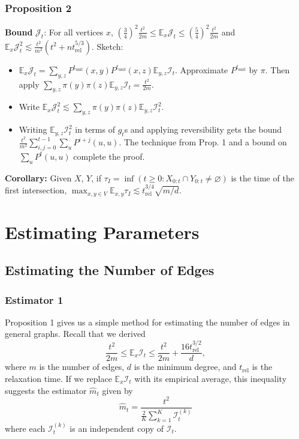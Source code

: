 \documentclass{beamer}
\newcommand{\E}{\mathbb{E}}
\begin{document}
\begin{frame}
\frametitle{Proposition 2}
\textbf{Bound} $\mathcal{J}_t$: For all vertices $x$, $\left(\frac{3}{4}\right)^2 \frac{t^2}{2m}\leq \E_x\mathcal{J}_t\leq \left(\frac{5}{4}\right)^2 \frac{t^2}{2m}$ and $\E_x \mathcal{J}_t^2\lesssim \frac{t^2}{m^2}\left(t^2+nt_{\text{rel}}^{5/3}\right)$. Sketch:
\begin{itemize}
    \item $\E_x\mathcal{J}_t=\sum_{y,z} P^{t_{\text{unif}}}(x,y)P^{t_{\text{unif}}}(x,z)\E_{y,z}\mathcal{I}_t$. Approximate $P^{t_{\text{unif}}}$ by $\pi$. Then apply $\sum_{y,z} \pi(y)\pi(z)\E_{y,z}\mathcal{I}_t=\frac{t^2}{2m}$.
    \item Write $\E_x\mathcal{J}_t^2\lesssim \sum_{y,z} \pi(y)\pi(z)\E_{y,z}\mathcal{I}_t^2$.
    \item Writing $\E_{y,z}\mathcal{I}_t^2$ in terms of $g_t$s and applying reversibility gets the bound $\frac{t^2}{m^2}\sum_{i,j=0}^{t-1}\sum_u P^{i+j}(u,u)$. The technique from Prop. 1 and a bound on $\sum_u P^t(u,u)$ complete the proof.
\end{itemize}
\textbf{Corollary:} Given $X$, $Y$, if $\tau_I=\inf(t\geq 0: X_{0:t}\cap Y_{0:t}\neq \varnothing)$ is the time of the first intersection, $\max_{x,y\in V}\E_{x,y}\tau_I\lesssim t_{\text{rel}}^{3/4}\sqrt{m/d}$.
\end{frame}


\section{Estimating Parameters}
\subsection{Estimating the Number of Edges}
\begin{frame}
\frametitle{Estimator 1}
Proposition 1 gives us a simple method for estimating the number of edges in general graphs. Recall that we derived
$$
\frac{t^2}{2m} \leq \E_x\mathcal{I}_t \leq \frac{t^2}{2m} + \frac{16t_{\text{rel}}^{3/2}}{d},
$$
where $m$ is the number of edges, $d$ is the minimum degree, and $t_{\text{rel}}$ is the relaxation time. If we replace $\E_x\mathcal{I}_t$ with its empirical average, this inequality suggests the estimator $\hat{m}_t$ given by
$$
\hat{m}_t = \frac{t^2}{\frac{2}{K}\sum_{k=1}^K \mathcal{I}_t^{(k)}}
$$
where each $\mathcal{I}_t^{(k)}$ is an independent copy of $\mathcal{I}_t$.
\end{frame}
\end{document}
